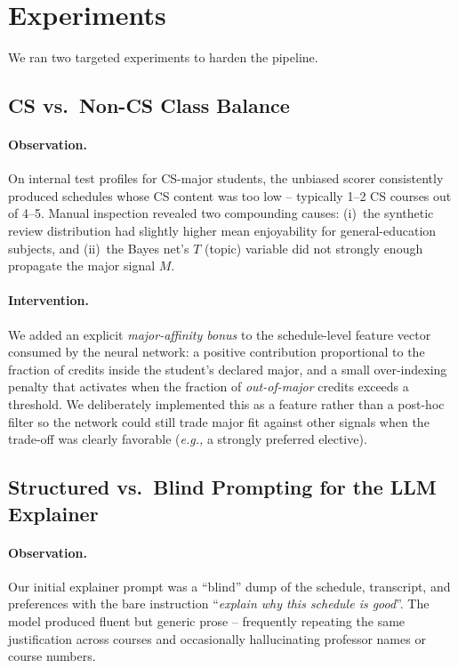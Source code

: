 \documentclass[10pt,letterpaper]{article}
\newcommand{\eg}{\emph{e.g.,}}
\begin{document}
\section{Experiments}
\label{sec:experiments}

We ran two targeted experiments to harden the pipeline.

\subsection{CS vs.\ Non-CS Class Balance}

\paragraph{Observation.} On internal test profiles for CS-major students,
the unbiased scorer consistently produced schedules whose CS content was
too low -- typically 1--2 CS courses out of 4--5. Manual inspection
revealed two compounding causes: (i)~the synthetic review distribution had
slightly higher mean enjoyability for general-education subjects, and
(ii)~the Bayes net's $T$ (topic) variable did not strongly enough propagate
the major signal $M$.

\paragraph{Intervention.} We added an explicit \emph{major-affinity bonus}
to the schedule-level feature vector consumed by the neural network: a
positive contribution proportional to the fraction of credits inside the
student's declared major, and a small over-indexing penalty that activates
when the fraction of \emph{out-of-major} credits exceeds a threshold. We
deliberately implemented this as a feature rather than a post-hoc filter so
the network could still trade major fit against other signals when the
trade-off was clearly favorable (\eg{} a strongly preferred elective).

\subsection{Structured vs.\ Blind Prompting for the LLM Explainer}

\paragraph{Observation.} Our initial explainer prompt was a ``blind'' dump
of the schedule, transcript, and preferences with the bare instruction
``\emph{explain why this schedule is good}''. The model produced fluent but
generic prose -- frequently repeating the same justification across courses
and occasionally hallucinating professor names or course numbers.
\end{document}
